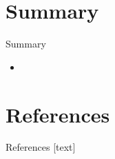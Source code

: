 \documentclass[11pt,aspectratio=1610,dvipsnames]{beamer}
\begin{document}
\section{Summary}
\begin{frame}{Summary}
	\begin{tcolorbox}[colback=black!5,colframe=gray!15!black,title=, width=\linewidth]
		\begin{itemize}
			\item 
		\end{itemize}
	\end{tcolorbox}
\end{frame}

\section*{References}
\begin{frame}[allowframebreaks]{References}
	[text]
	
	
\end{frame}
\end{document}
